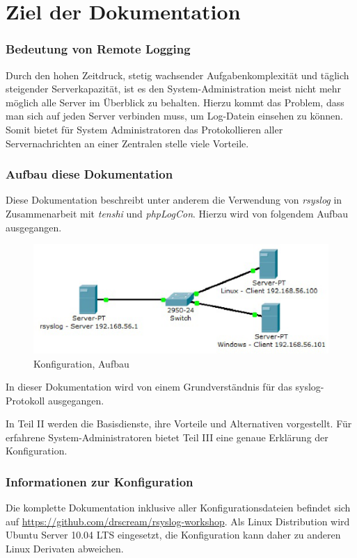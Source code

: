 \part{Ziel der Dokumentation}
\label{Ziel der Dokumentation}
\section{Bedeutung von Remote Logging}
Durch den hohen Zeitdruck, stetig wachsender Aufgabenkomplexität und täglich steigender Serverkapazität, ist es den System-Administration meist nicht mehr möglich alle Server im Überblick zu behalten. Hierzu kommt das Problem, dass man sich auf jeden Server verbinden muss, um Log-Datein einsehen zu können. Somit bietet für System Administratoren das Protokollieren aller Servernachrichten an einer Zentralen stelle viele Vorteile.

\section{Aufbau diese Dokumentation}
Diese Dokumentation beschreibt unter anderem die Verwendung von \textit{rsyslog} in Zusammenarbeit mit \textit{tenshi} und \textit{phpLogCon}. Hierzu wird von folgendem Aufbau ausgegangen.

\begin{figure}[h]
\begin{center}
 \includegraphics[width=\textwidth]{content/images/Server-Aufbau.eps}
  \caption{Konfiguration, Aufbau}
\end{center}
\end{figure}

In dieser Dokumentation wird von einem Grundverständnis für das syslog-Protokoll ausgegangen.

In Teil II werden die Basisdienste, ihre Vorteile und Alternativen vorgestellt. Für erfahrene System-Administratoren bietet Teil III eine genaue Erklärung der Konfiguration.

\section{Informationen zur Konfiguration}
Die komplette Dokumentation inklusive aller Konfigurationsdateien befindet sich auf \url{https://github.com/drscream/rsyslog-workshop}. Als Linux Distribution wird Ubuntu Server 10.04 LTS eingesetzt, die Konfiguration kann daher zu anderen Linux Derivaten abweichen.

